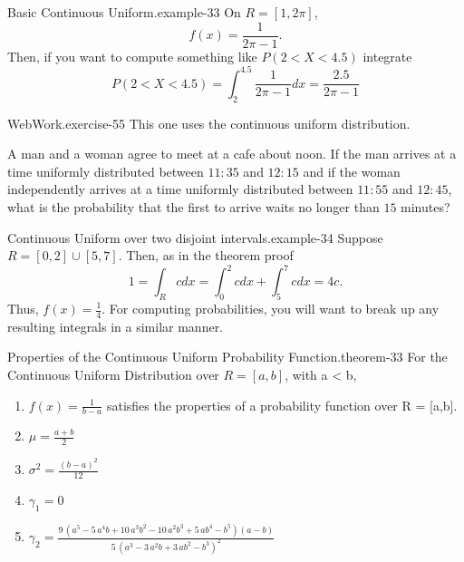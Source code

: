 \documentclass[10pt,]{book}
\numberwithin{equation}{section}
\begin{document}
%
\par
\hypertarget{p-813}{}%
\begin{example}{Basic Continuous Uniform.}{example-33}%
\hypertarget{p-814}{}%
On \(R = [1,2 \pi]\),%
\begin{equation*}
f(x) = \frac{1}{2 \pi - 1}.
\end{equation*}
Then, if you want to compute something like \(P(2 < X < 4.5)\) integrate%
\begin{equation*}
P(2 < X < 4.5) = \int_2^{4.5} \frac{1}{2 \pi -1} dx = \frac{2.5}{2 \pi - 1}
\end{equation*}
%
\end{example}
%
\par
\hypertarget{p-815}{}%
\begin{inlineexercise}{WebWork.}{exercise-55}%
\hypertarget{p-816}{}%
This one uses the continuous uniform distribution.%
\par\medskip
\hypertarget{p-817}{}%
A man and a woman agree to meet at a cafe about noon. If the man arrives at a time uniformly distributed between \(11:35\) and \(12:15\) and if the woman independently arrives at a time uniformly distributed between \(11:55\) and \(12:45\), what is the probability that the first to arrive waits no longer than \(15\) minutes?%
\end{inlineexercise}
%
\par
\hypertarget{p-819}{}%
\begin{example}{Continuous Uniform over two disjoint intervals.}{example-34}%
\hypertarget{p-820}{}%
Suppose \(R = [0,2] \cup [5,7]\).  Then, as in the theorem proof%
\begin{equation*}
1 = \int_R c dx = \int_0^2 c dx + \int_5^7 c dx = 4c.
\end{equation*}
Thus, \(f(x) = \frac{1}{4}\). For computing probabilities, you will want to break up any resulting integrals in a similar manner.%
\end{example}
%
\par
\hypertarget{p-821}{}%
\begin{theorem}{Properties of the Continuous Uniform Probability Function.}{}{theorem-33}%
\hypertarget{ContinuousUniformProperties}{}%
For the Continuous Uniform Distribution over \(R = [a,b]\), with a < b, \leavevmode%
\begin{enumerate}
\item\hypertarget{li-213}{}\(f(x) = \frac{1}{b-a}\) satisfies the properties of a probability function over R = [a,b].%
\item\hypertarget{li-214}{}\(\mu = \frac{a+b}{2}\)%
\item\hypertarget{li-215}{}\(\sigma^2 = \frac{(b-a)^2}{12}\)%
\item\hypertarget{li-216}{}\(\gamma_1 = 0\)%
\item\hypertarget{li-217}{}\(\gamma_2 = \frac{9 \, {\left(a^{5} - 5 \, a^{4} b + 10 \, a^{3} b^{2} - 10 \, a^{2} b^{3} + 5 \, a b^{4} - b^{5}\right)} {\left(a - b\right)}}{5 \, {\left(a^{3} - 3 \, a^{2} b + 3 \, a b^{2} - b^{3}\right)}^{2}}\)%
\end{enumerate}
%
\end{theorem}
\end{document}
